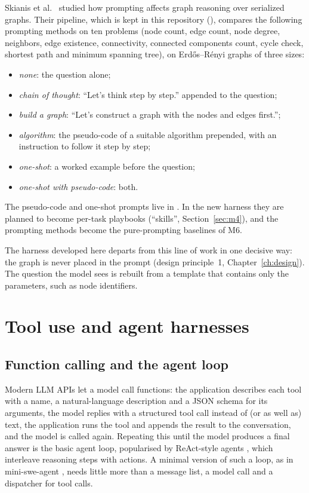 Skianis et al.\ \cite{skianis2024pseudocode} studied how prompting affects graph reasoning over serialized graphs.
Their pipeline, which is kept in this repository (), compares the following prompting methods
on ten problems (node count, edge count, node degree, neighbors, edge existence, connectivity, connected components
count, cycle check, shortest path and minimum spanning tree), on Erd\H{o}s--R\'enyi graphs of three sizes:
\begin{itemize}
  \item \emph{none}: the question alone;
  \item \emph{chain of thought}: ``Let's think step by step.'' appended to the question;
  \item \emph{build a graph}: ``Let's construct a graph with the nodes and edges first.'';
  \item \emph{algorithm}: the pseudo-code of a suitable algorithm prepended, with an instruction to follow it step by step;
  \item \emph{one-shot}: a worked example before the question;
  \item \emph{one-shot with pseudo-code}: both.
\end{itemize}
The pseudo-code and one-shot prompts live in . In the new harness they are planned to become
per-task playbooks (``skills'', Section~\ref{sec:m4}), and the prompting methods become the pure-prompting baselines
of M6.

The harness developed here departs from this line of work in one decisive way: the graph is never placed in the
prompt (design principle~1, Chapter~\ref{ch:design}). The question the model sees is rebuilt from a template that
contains only the parameters, such as node identifiers.

\section{Tool use and agent harnesses}

\subsection{Function calling and the agent loop}

Modern LLM APIs let a model call functions: the application describes each tool with a name, a natural-language
description and a JSON schema for its arguments, the model replies with a structured tool call instead of (or as well
as) text, the application runs the tool and appends the result to the conversation, and the model is called again.
Repeating this until the model produces a final answer is the basic agent loop, popularised by ReAct-style agents
\cite{react}, which interleave reasoning steps with actions. A minimal version of such a loop, as in mini-swe-agent
\cite{miniswe}, needs little more than a message list, a model call and a dispatcher for tool calls.

